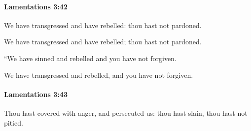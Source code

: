		\paragraph{Lamentations 3:42} %
			\label{LAMENTATIONS-3-42}

			We have transgressed and have rebelled: thou hast not pardoned.

			\begin{versebox}
					\item[BHS] 
					\item[LXX] 
					\item[ASV] We have transgressed and have rebelled; thou hast not pardoned.
					\item[NIV] “We have sinned and rebelled and you have not forgiven.
					\item[NRSV] We have transgressed and rebelled, and you have not forgiven.
			\end{versebox}

		\paragraph{Lamentations 3:43} %
			\label{LAMENTATIONS-3-43}

			Thou hast covered with anger, and persecuted us: thou hast slain, thou hast not pitied.

